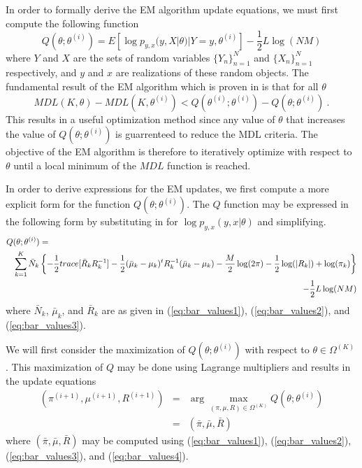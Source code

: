 \documentclass[12pt]{article}
\begin{document}
In order to formally derive the EM algorithm update equations,
we must first compute the following function
$$
Q(\theta;\theta^{(i)}) 
= E\left[  \log p_{y,x}(y,X|\theta) | Y=y, \theta^{(i)} \right]
- \frac{1}{2} L \log (NM)
$$
where $Y$ and $X$ are the sets of random variables 
$\{Y_n\}_{n=1}^N$ and $\{X_n\}_{n=1}^N$ respectively,
and $y$ and $x$ are realizations of these random objects.
The fundamental result of the EM algorithm
which is proven in \cite{BaPeSoWe70} is that for all $\theta$
$$
MDL(K,\theta) - MDL(K,\theta^{(i)}) 
<
Q( \theta^{(i)}; \theta^{(i)}) - Q(\theta; \theta^{(i)}) \ .
$$
This results in a useful optimization method since 
any value of $\theta$ that increases the value of $Q(\theta; \theta^{(i)})$
is guarrenteed to reduce the MDL criteria.
The objective of the EM algorithm is therefore to iteratively
optimize with respect to $\theta$ until a local minimum
of the $MDL$ function is reached.

In order to derive expressions for the EM updates,
we first compute a more explicit form 
for the function $Q(\theta; \theta^{(i)})$.
The $Q$ function may be expressed in the following
form by substituting in for $\log p_{y,x}(y,x|\theta)$ and simplifying.
\begin{eqnarray*}
\lefteqn{ Q(\theta;\theta^{(i)}) = } \\
& & \sum_{k=1}^K \bar{N}_k \left\{
-\frac{1}{2} trace[\bar{R}_k R_k^{-1} ]
-\frac{1}{2} (\bar{\mu}_k -\mu_k)^t R_k^{-1}(\bar{\mu}_k -\mu_k)
-\frac{M}{2} \log(2\pi) 
-\frac{1}{2} \log(|R_k|) 
+\log(\pi_k) \right\} \\
& & - \frac{1}{2} L \log (NM)
\end{eqnarray*}
where $\bar{N}_k$, $\bar{\mu}_k$, and $\bar{R}_k$ are as 
given in (\ref{eq:bar_values1}), (\ref{eq:bar_values2}), and (\ref{eq:bar_values3}).

We will first consider the maximization of $Q(\theta; \theta^{(i)})$
with respect to $\theta\in \Omega^{(K)}$.
This maximization of $Q$ may be done using Lagrange multipliers
and results in the update equations
\begin{eqnarray}
\nonumber
(\pi^{(i+1)},\mu^{(i+1)},R^{(i+1)}) 
&=&  \arg \max_{ (\pi,\mu,R)\in \Omega^{(K)} }
Q(\theta;\theta^{(i)}) \\
&=& (\bar{\pi},\bar{\mu},\bar{R}) 
\label{eq:EM1_update}
\end{eqnarray}
where $(\bar{\pi},\bar{\mu},\bar{R})$ may be computed using 
(\ref{eq:bar_values1}), (\ref{eq:bar_values2}), (\ref{eq:bar_values3}), and (\ref{eq:bar_values4}).
\end{document}
